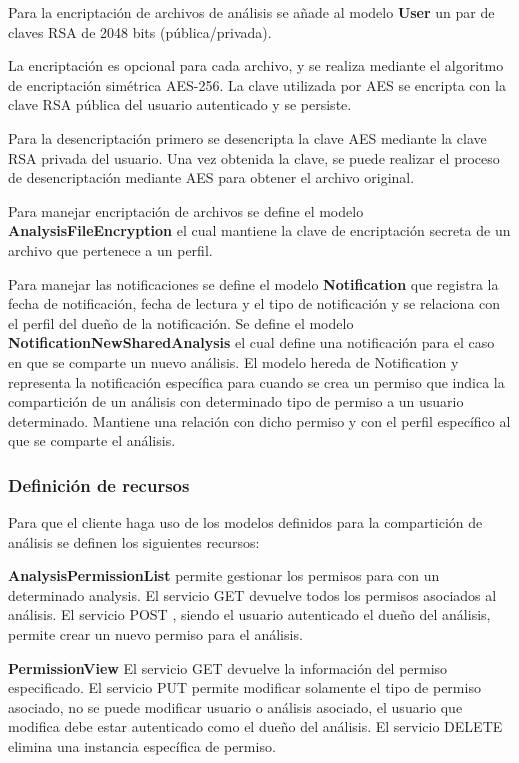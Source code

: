 Para la encriptación de archivos de análisis se añade al modelo \textbf{User} un par de claves RSA de 2048 bits (pública/privada).

La encriptación es opcional para cada archivo, y se realiza mediante el algoritmo de encriptación simétrica AES-256. La clave utilizada por AES se encripta con la clave RSA pública del usuario autenticado y se persiste.

Para la desencriptación primero se desencripta la clave AES mediante la clave RSA privada del usuario. Una vez obtenida la clave, se puede realizar el proceso de desencriptación mediante AES para obtener el archivo original.

Para manejar encriptación de archivos se define el modelo \textbf{AnalysisFileEncryption} el cual mantiene la clave de encriptación secreta de un archivo que pertenece a un perfil.

Para manejar las notificaciones se define el modelo \textbf{Notification} que registra la fecha de notificación, fecha de lectura y el tipo de notificación y se relaciona con el perfil del dueño de la notificación. Se define el modelo \textbf{NotificationNewSharedAnalysis} el cual define una notificación para el caso en que se comparte un nuevo análisis. El modelo hereda de Notification y representa la notificación específica para cuando se crea un permiso que indica la compartición de un análisis con determinado tipo de permiso a un usuario determinado. Mantiene una relación con dicho permiso y con el perfil específico al que se comparte el análisis.

\subsubsection{Definición de recursos}

Para que el cliente haga uso de los modelos definidos para la compartición de análisis se definen los siguientes recursos:

\textbf{AnalysisPermissionList} permite gestionar los permisos para con un determinado analysis. El servicio GET devuelve todos los permisos asociados al análisis. El servicio POST , siendo el usuario autenticado el dueño del análisis, permite crear un nuevo permiso para el análisis.

\textbf{PermissionView} El servicio GET devuelve la información del permiso especificado. El servicio PUT permite modificar solamente el tipo de permiso asociado, no se puede modificar usuario o análisis asociado, el usuario que modifica debe estar autenticado como el dueño del análisis. El servicio DELETE elimina una instancia específica de permiso.

